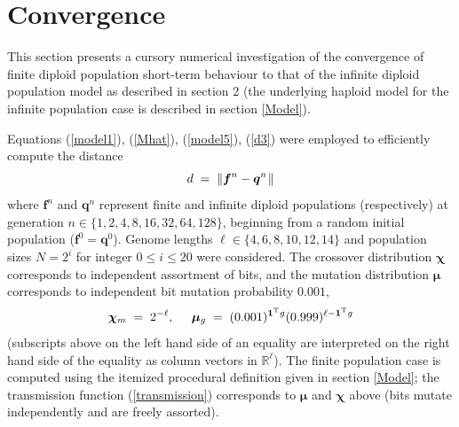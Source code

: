 \section{Convergence}
This section presents a cursory numerical investigation of the
convergence of finite diploid population short-term behaviour to that
of the infinite diploid population model as described in section 2
(the underlying haploid model for the infinite population case is
described in section \ref{Model}).

Equations (\ref{model1}), (\ref{Mhat}),
(\ref{model5}), (\ref{d3}) were employed to efficiently
compute the distance
\[
d \; = \; \|{\bm f}^n - {\bm q}^n \hspace{0.01in} \|
\]
where ${\bm f}^n$ and ${\bm q}^n$ represent finite and infinite diploid
populations (respectively) at generation $n \in \{1,2,4,8,16,32,64,128\}$, 
beginning from a random initial population (${\bm f}^0 =
{\bm q}^0$). Genome lengths $\ell \in \{4,6,8,10,12,14\}$ and population
sizes $N = 2^i$ for integer $0 \le i \le 20$ were considered.  The
crossover distribution ${\bm \chi}$ corresponds to independent assortment of
bits, and the mutation distribution ${\bm \mu}$ corresponds to independent
bit mutation probability $0.001$,
\[
{\bm \chi}_m \; = \; 2^{-\ell}, \;\;\;\;\; {\bm \mu}_g \; = \; (0.001)^{{\bf 1}^{\rm T}
  g}(0.999)^{\ell - {\bf 1}^{\rm T} g}
\]
(subscripts above on the left hand side of an equality are interpreted
on the right hand side of the equality as column vectors in
$\mathbb{R}^{\ell}$). The finite population case is computed using the
itemized procedural definition given in section \ref{Model}; the transmission
function (\ref{transmission}) corresponds to ${\bm \mu}$ and ${\bm
  \chi}$ above (bits mutate independently and are freely assorted).

